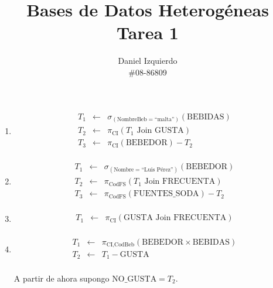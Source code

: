 \documentclass[12pt]{article}
\newcommand{\asig}{\ensuremath{\leftarrow}}
\begin{document}

\title{Bases de Datos Heterogéneas \\ Tarea 1}
\author{Daniel Izquierdo \\ \#08-86809}

\maketitle

\begin{enumerate}

 \item

\begin{eqnarray*}
 T_1 & \asig & \sigma_{(\text{NombreBeb}=\text{``malta''})}(\text{BEBIDAS}) \\
 T_2 & \asig & \pi_{\text{CI}}(T_1 \text{ Join } \text{GUSTA}) \\
 T_3 & \asig & \pi_{\text{CI}}(\text{BEBEDOR}) - T_2 \\
\end{eqnarray*}

 \item

\begin{eqnarray*}
 T_1 & \asig & \sigma_{(\text{Nombre}=\text{``Luis Pérez''})}(\text{BEBEDOR}) \\
 T_2 & \asig & \pi_{\text{CodFS}}(T_1 \text{ Join } \text{FRECUENTA}) \\
 T_3 & \asig & \pi_{\text{CodFS}}(\text{FUENTES\_SODA}) - T_2 \\
\end{eqnarray*}

 \item

\begin{eqnarray*}
 T_1 & \asig & \pi_{\text{CI}}(\text{GUSTA} \text{ Join } \text{FRECUENTA}) \\
\end{eqnarray*}

 \item

\begin{eqnarray*}
 T_1 & \asig & \pi_{\text{CI,CodBeb}}(\text{BEBEDOR} \times \text{BEBIDAS}) \\
 T_2 & \asig & T_1 - \text{GUSTA} \\
\end{eqnarray*}

A partir de ahora supongo $\text{NO\_GUSTA} = T_2$.


\end{enumerate}
\end{document}
